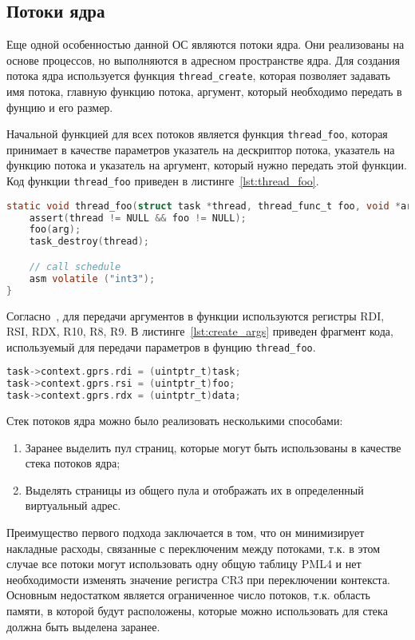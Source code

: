 \subsection{Потоки ядра}
Еще одной особенностью данной ОС являются потоки ядра. Они реализованы на основе процессов, но
выполняются в адресном пространстве ядра. Для создания потока ядра используется функция \texttt{thread\_create},
которая позволяет задавать имя потока, главную функцию потока, аргумент, который необходимо передать в фунцию
и его размер.

Начальной функцией для всех потоков является функция \texttt{thread\_foo}, которая принимает в качестве
параметров указатель на дескриптор потока, указатель на функцию потока и указатель на аргумент, который
нужно передать этой функции. Код функции \texttt{thread\_foo} приведен в листинге~\ref{lst:thread_foo}.

\begin{lstlisting}[language=C,
caption={Точка входа потоков ядра},
label={lst:thread_foo}]
static void thread_foo(struct task *thread, thread_func_t foo, void *arg) {
	assert(thread != NULL && foo != NULL);
	foo(arg);
	task_destroy(thread);

	// call schedule
	asm volatile ("int3");
}
\end{lstlisting}

Согласно~\cite{x86_64_abi}, для передачи аргументов в функции используются регистры RDI, RSI, RDX, R10, R8, R9.
В листинге~\ref{lst:create_args} приведен фрагмент кода, используемый для передачи параметров в фунцию \texttt{thread\_foo}.

\begin{lstlisting}[language=C,
caption={Передача параметров в функцию \texttt{thread\_foo}},
label={lst:create_args}]
task->context.gprs.rdi = (uintptr_t)task;
task->context.gprs.rsi = (uintptr_t)foo;
task->context.gprs.rdx = (uintptr_t)data;
\end{lstlisting}

Стек потоков ядра можно было реализовать несколькими способами:
\begin{enumerate}[1.]
\item Заранее выделить пул страниц, которые могут быть использованы в качестве стека потоков ядра;
\item Выделять страницы из общего пула и отображать их в определенный виртуальный адрес.
\end{enumerate}

Преимущество первого подхода заключается в том, что он минимизирует накладные расходы, связанные
с переключеним между потоками, т.к. в этом случае все потоки могут использовать одну общую таблицу
PML4 и нет необходимости изменять значение регистра CR3 при переключении контекста. Основным
недостатком является ограниченное число потоков, т.к. область памяти, в которой будут расположены,
которые можно использовать для стека должна быть выделена заранее.

